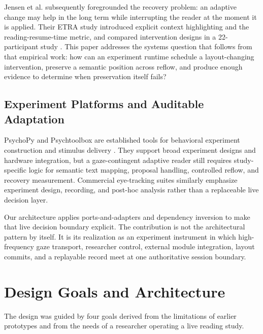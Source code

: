 \documentclass[sigconf,review,anonymous]{acmart}
\begin{document}
Jensen et al. subsequently foregrounded the recovery problem: an adaptive change may help in the long term while interrupting the reader at the moment it is applied.
Their ETRA study introduced explicit context highlighting and the reading-resume-time metric, and compared intervention designs in a 22-participant study \cite{jensen2025context}.
This paper addresses the systems question that follows from that empirical work: how can an experiment runtime schedule a layout-changing intervention, preserve a semantic position across reflow, and produce enough evidence to determine when preservation itself fails?

\subsection{Experiment Platforms and Auditable Adaptation}

PsychoPy and Psychtoolbox are established tools for behavioral experiment construction and stimulus delivery \cite{peirce2019psychopy,brainard1997psychtoolbox}.
They support broad experiment designs and hardware integration, but a gaze-contingent adaptive reader still requires study-specific logic for semantic text mapping, proposal handling, controlled reflow, and recovery measurement.
Commercial eye-tracking suites similarly emphasize experiment design, recording, and post-hoc analysis rather than a replaceable live decision layer.

Our architecture applies ports-and-adapters and dependency inversion \cite{cockburn2005hexagonal,martin1996dip,martin2017cleanarch} to make that live decision boundary explicit.
The contribution is not the architectural pattern by itself.
It is its realization as an experiment instrument in which high-frequency gaze transport, researcher control, external module integration, layout commits, and a replayable record meet at one authoritative session boundary.

\section{Design Goals and Architecture}

The design was guided by four goals derived from the limitations of earlier prototypes and from the needs of a researcher operating a live reading study.
\end{document}
